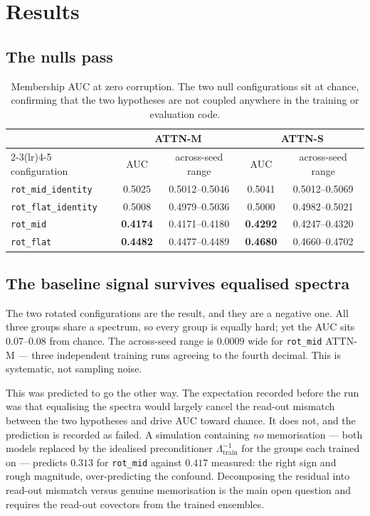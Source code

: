 \documentclass[11pt,a4paper]{article}
\begin{document}
\section{Results}
\subsection{The nulls pass}


\begin{table}[h]\centering\small
\begin{tabular}{lcccc}
\toprule
& \multicolumn{2}{c}{ATTN-M} & \multicolumn{2}{c}{ATTN-S}\\
\cmidrule(lr){2-3}\cmidrule(lr){4-5}
configuration & AUC & across-seed range & AUC & across-seed range \\
\midrule
\texttt{rot\_mid\_identity} & 0.5025 & 0.5012--0.5046 & 0.5041 & 0.5012--0.5069 \\
\texttt{rot\_flat\_identity} & 0.5008 & 0.4979--0.5036 & 0.5000 & 0.4982--0.5021 \\
\texttt{rot\_mid} & \textbf{0.4174} & 0.4171--0.4180 & \textbf{0.4292} & 0.4247--0.4320 \\
\texttt{rot\_flat} & \textbf{0.4482} & 0.4477--0.4489 & \textbf{0.4680} & 0.4660--0.4702 \\
\bottomrule
\end{tabular}
\caption{Membership AUC at zero corruption. The two null configurations sit at
chance, confirming that the two hypotheses are not coupled anywhere in the
training or evaluation code.}
\end{table}

\subsection{The baseline signal survives equalised spectra}

The two rotated configurations are the result, and they are a negative one. All
three groups share a spectrum, so every group is equally hard; yet the AUC sits
0.07--0.08 from chance. The across-seed range is $0.0009$ wide for
\texttt{rot\_mid} ATTN-M --- three independent training runs agreeing to
the fourth decimal. This is systematic, not sampling noise.

This was predicted to go the other way. The expectation recorded before the run
was that equalising the spectra would largely cancel the read-out mismatch
between the two hypotheses and drive AUC toward chance. It does not, and the
prediction is recorded as failed. A simulation containing \emph{no} memorisation
--- both models replaced by the idealised preconditioner
$\Lambda_{\text{train}}^{-1}$ for the groups each trained on --- predicts
$0.313$ for \texttt{rot\_mid} against $0.417$ measured: the right sign
and rough magnitude, over-predicting the confound. Decomposing the residual
into read-out mismatch versus genuine memorisation is the main open question
and requires the read-out covectors from the trained ensembles.
\end{document}
